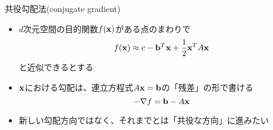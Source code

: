 \begin{frame}[t,fragile]{共役勾配法(conjugate gradient)}
  \begin{itemize}
    \setlength{\itemsep}{1em}
  \item $d$次元空間の目的関数$f({\bf x})$がある点のまわりで
    \[
    f({\bf x}) \approx c - {\bf b}^T {\bf x} + \frac{1}{2} {\bf x}^T A {\bf x}
    \]
    と近似できるとする
  \item ${\bf x}$における勾配は、連立方程式$A{\bf x}={\bf b}$の「残差」の形で書ける
    \[
    -\nabla f = {\bf b} - A {\bf x}
    \]
  \item 新しい勾配方向ではなく、それまでとは「共役な方向」に進みたい
  \end{itemize}
\end{frame}
